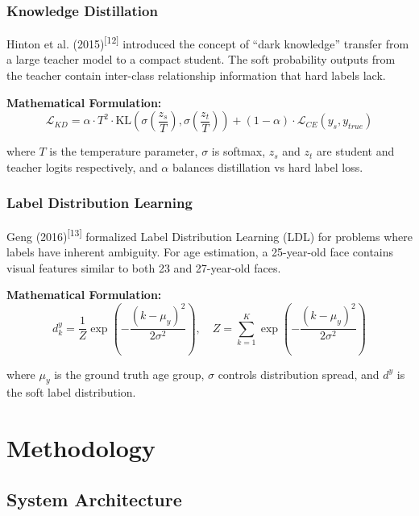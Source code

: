 \documentclass[12pt,a4paper]{article}
\begin{document}
\subsubsection{Knowledge Distillation}

Hinton et al. (2015)\textsuperscript{[12]} introduced the concept of ``dark knowledge'' transfer from a large teacher model to a compact student. The soft probability outputs from the teacher contain inter-class relationship information that hard labels lack.

\textbf{Mathematical Formulation:}
\begin{equation}
    \mathcal{L}_{KD} = \alpha \cdot T^2 \cdot \text{KL}\left(\sigma\left(\frac{z_s}{T}\right), \sigma\left(\frac{z_t}{T}\right)\right) + (1-\alpha) \cdot \mathcal{L}_{CE}(y_s, y_{true})
\end{equation}

where $T$ is the temperature parameter, $\sigma$ is softmax, $z_s$ and $z_t$ are student and teacher logits respectively, and $\alpha$ balances distillation vs hard label loss.

\subsubsection{Label Distribution Learning}

Geng (2016)\textsuperscript{[13]} formalized Label Distribution Learning (LDL) for problems where labels have inherent ambiguity. For age estimation, a 25-year-old face contains visual features similar to both 23 and 27-year-old faces.

\textbf{Mathematical Formulation:}
\begin{equation}
    d^y_k = \frac{1}{Z} \exp\left(-\frac{(k - \mu_y)^2}{2\sigma^2}\right), \quad Z = \sum_{k=1}^{K} \exp\left(-\frac{(k - \mu_y)^2}{2\sigma^2}\right)
\end{equation}

where $\mu_y$ is the ground truth age group, $\sigma$ controls distribution spread, and $d^y$ is the soft label distribution.

\section{Methodology}

\subsection{System Architecture}
\end{document}
